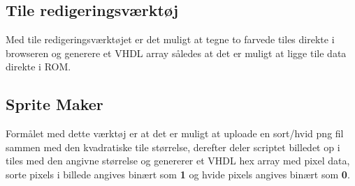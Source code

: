 \subsection*{Tile redigeringsværktøj}
Med tile redigeringsværktøjet er det muligt at tegne to farvede tiles direkte i browseren og generere et VHDL array således at det er muligt at ligge tile data direkte i ROM.

\subsection*{Sprite Maker}
Formålet med dette værktøj er at det er muligt at uploade en sort/hvid png fil sammen med den kvadratiske tile størrelse, derefter deler scriptet billedet op i tiles med den angivne størrelse og genererer et VHDL hex array med pixel data, sorte pixels i billede angives binært som \textbf{1} og hvide pixels angives binært som \textbf{0}.